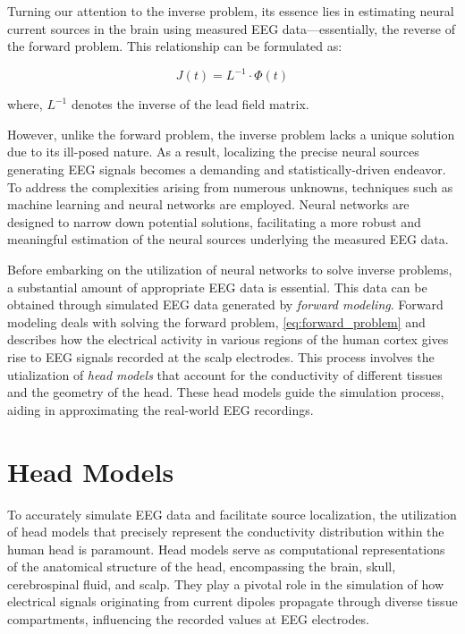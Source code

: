 \documentclass[a4paper, UKenglish, 11pt]{uiomaster}
\begin{document}
Turning our attention to the inverse problem, its essence lies in estimating neural current sources in the brain using measured EEG data—essentially, the reverse of the forward problem. This relationship can be formulated as:

\begin{equation}
J(t) = L^{-1} \cdot \Phi(t)
\label{eq:inverse_problem}
\end{equation}

where, $L^{-1}$ denotes the inverse of the lead field matrix.

However, unlike the forward problem, the inverse problem lacks a unique solution due to its ill-posed nature. As a result, localizing the precise neural sources generating EEG signals becomes a demanding and statistically-driven endeavor. To address the complexities arising from numerous unknowns, techniques such as machine learning and neural networks are employed. Neural networks are designed to narrow down potential solutions, facilitating a more robust and meaningful estimation of the neural sources underlying the measured EEG data.


Before embarking on the utilization of neural networks to solve inverse problems, a substantial amount of appropriate EEG data is essential. This data can be obtained through simulated EEG data generated by \emph{forward modeling}. Forward modeling deals with solving the forward problem, \ref{eq:forward_problem} and describes how the electrical activity in various regions of the human cortex gives rise to EEG signals recorded at the scalp electrodes. This process involves the utialization of \emph{head models} that account for the conductivity of different tissues and the geometry of the head. These head models guide the simulation process, aiding in approximating the real-world EEG recordings.


\section{Head Models}
To accurately simulate EEG data and facilitate source localization, the utilization of head models that precisely represent the conductivity distribution within the human head is paramount. Head models serve as computational representations of the anatomical structure of the head, encompassing the brain, skull, cerebrospinal fluid, and scalp. They play a pivotal role in the simulation of how electrical signals originating from current dipoles propagate through diverse tissue compartments, influencing the recorded values at EEG electrodes.
\end{document}
